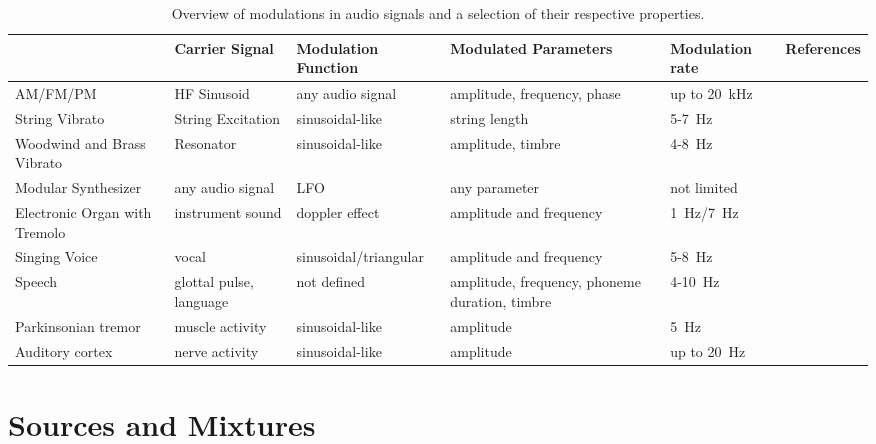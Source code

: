 \begin{table}[]
\scriptsize
\centering
\begin{adjustbox}{angle=90}
\begin{tabular}{@{}lllp{3.5cm}ll@{}}
\toprule
                          & Carrier Signal    & Modulation Function & Modulated Parameters        & Modulation rate & References\\ 
\midrule
AM/FM/PM                  & HF Sinusoid       & any audio signal    & amplitude, frequency, phase & up to 20~\si{\kilo\hertz}     & \cite{shannon48}        \\
String Vibrato & String Excitation & sinusoidal-like     & string length   & 5-7~\si{\hertz}          & \cite{fletcher01, macleod06}\\
Woodwind and Brass Vibrato & Resonator & sinusoidal-like & amplitude, timbre               & 4-8~\si{\hertz}          & \cite{fletcher01, gilbert05}\\
Modular Synthesizer       & any audio signal  & LFO                 & any parameter               & not limited     & \cite{buchla05, pinch09}\\ 
Electronic Organ with Tremolo  & instrument sound & doppler effect      & amplitude and frequency & 1~\si{\hertz}/7~\si{\hertz} & \cite{leslie49} \\
Singing Voice  & vocal &  sinusoidal/triangular &  amplitude and frequency & 5-8~\si{\hertz} & \cite{sundberg94} \\
Speech  & glottal pulse, language & not defined & amplitude, frequency, \newline phoneme duration, timbre& 4-10~\si{\hertz} & \cite{plomp83, fuellgrabe09}\\
Parkinsonian tremor  & muscle activity &  sinusoidal-like & amplitude & 5~\si{\hertz} & \cite{botzel14}\\
Auditory cortex  & nerve activity &  sinusoidal-like & amplitude & up to 20~\si{\hertz} & \cite{schreiner88}\\
\bottomrule
\end{tabular}
\end{adjustbox}
\caption{Overview of modulations in audio signals and a selection of their respective properties.}%
\label{tab:modulations}
\end{table}

\hypertarget{sources-and-mixtures}{%
\section{Sources and Mixtures}\label{sources-and-mixtures}}

